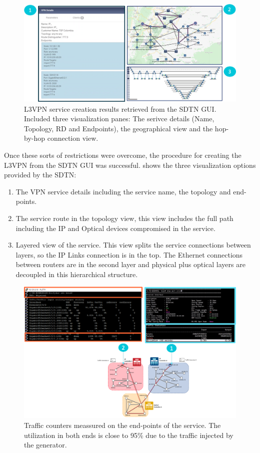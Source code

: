 \documentclass[a4paper,fleqn]{cas-dc}
\begin{document}
\begin{figure}
	\centering
		\includegraphics[width=\linewidth]{figs/l3vpn_results.png}
	\caption{L3VPN service creation results retrieved from the SDTN GUI. Included three visualization panes: The serivce details (Name, Topology, RD and Endpoints), the geographical view and the hop-by-hop connection view.}
	\label{FIG:l3vpn_results}
\end{figure}

Once these sorts of restrictions were overcome, the procedure for creating the L3VPN from the SDTN GUI was successful.  shows the three visualization options provided by the SDTN:
\begin{enumerate}
    \item The VPN service details including the service name, the topology and end-points.
    \item The service route in the topology view, this view includes the full path including the IP and Optical devices compromised in the service.
    \item Layered view of the service. This view splits the service connections between layers, so the IP Links connection is in the top. The Ethernet connections between routers are in the second layer and physical plus optical layers are decoupled in this hierarchical structure.
\end{enumerate}

\begin{figure}
	\centering
		\includegraphics[width=\linewidth]{figs/counters.png}
	\caption{Traffic counters meassured on the end-points of the service. The utilization in both ends is close to 95\% due to the traffic injected by the generator.}
	\label{FIG:counters}
\end{figure}
\end{document}
